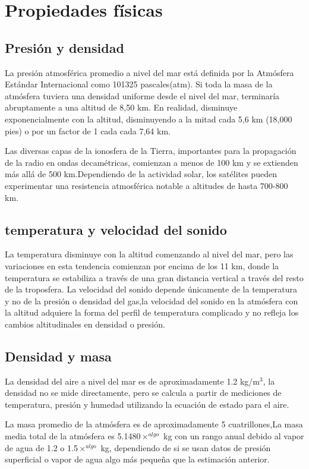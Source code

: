 \documentclass{article} %
\begin{document}
\section{Propiedades físicas}
\subsection{Presión y densidad}
La presión atmosférica promedio a nivel del mar está definida por la Atmósfera Estándar Internacional como 101325 pascales(atm).
Si toda la masa de la atmósfera tuviera una densidad uniforme desde el nivel del mar, terminaría abruptamente a una altitud de 8,50 km. En realidad, disminuye exponencialmente con la altitud, disminuyendo a la mitad cada 5,6 km (18,000 pies) o por un factor de 1 cada cada 7,64 km.

Las diversas capas de la ionosfera de la Tierra, importantes para la propagación de la radio en ondas decamétricas, comienzan a menos de 100 km y se extienden más allá de 500 km.Dependiendo de la actividad solar, los satélites pueden experimentar una resistencia atmosférica notable a altitudes de hasta 700-800 km.

\subsection{temperatura y velocidad del sonido}
La temperatura disminuye con la altitud comenzando al nivel del mar, pero las variaciones en esta tendencia comienzan por encima de los 11 km, donde la temperatura se estabiliza a través de una gran distancia vertical a través del resto de la troposfera.
La velocidad del sonido depende únicamente de la temperatura y no de la presión o densidad del gas,la velocidad del sonido en la atmósfera con la altitud adquiere la forma del perfil de temperatura complicado  y no refleja los cambios altitudinales en densidad o presión.


\subsection{Densidad y masa}
La densidad del aire a nivel del mar es de aproximadamente 1.2 kg/m$^{3}$, la densidad no se mide directamente, pero se calcula a partir de mediciones de temperatura, presión y humedad utilizando la ecuación de estado para el aire.

La masa promedio de la atmósfera es de aproximadamente 5 cuatrillones,La masa media total de la atmósfera es 5.1480$\times ^{algo}$ kg con un rango anual debido al vapor de agua de 1.2 o 1.5$\times ^{algo}$ kg, dependiendo de si se usan datos de presión superficial o vapor de agua algo más pequeña que la estimación anterior.
\end{document}
